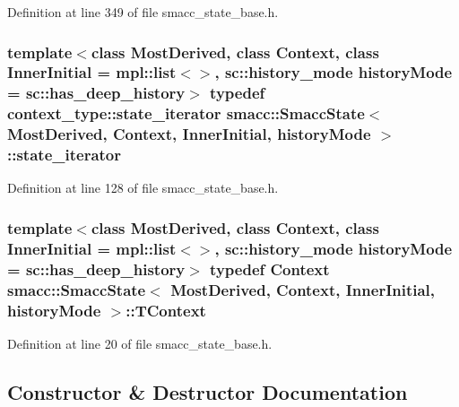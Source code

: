 Definition at line 349 of file smacc\+\_\+state\+\_\+base.\+h.

\subsubsection[{\texorpdfstring{state\+\_\+iterator}{state_iterator}}]{\setlength{\rightskip}{0pt plus 5cm}template$<$class Most\+Derived, class Context, class Inner\+Initial = mpl\+::list$<$$>$, sc\+::history\+\_\+mode history\+Mode = sc\+::has\+\_\+deep\+\_\+history$>$ typedef context\+\_\+type\+::state\+\_\+iterator {\bf smacc\+::\+Smacc\+State}$<$ Most\+Derived, Context, Inner\+Initial, history\+Mode $>$\+::{\bf state\+\_\+iterator}}\hypertarget{classsmacc_1_1SmaccState_a12497b38e710f07cacb5d45efc024339}{}\label{classsmacc_1_1SmaccState_a12497b38e710f07cacb5d45efc024339}


Definition at line 128 of file smacc\+\_\+state\+\_\+base.\+h.

\subsubsection[{\texorpdfstring{T\+Context}{TContext}}]{\setlength{\rightskip}{0pt plus 5cm}template$<$class Most\+Derived, class Context, class Inner\+Initial = mpl\+::list$<$$>$, sc\+::history\+\_\+mode history\+Mode = sc\+::has\+\_\+deep\+\_\+history$>$ typedef Context {\bf smacc\+::\+Smacc\+State}$<$ Most\+Derived, Context, Inner\+Initial, history\+Mode $>$\+::{\bf T\+Context}}\hypertarget{classsmacc_1_1SmaccState_a9953ba0428a8c46f7d72c70bc3f87db4}{}\label{classsmacc_1_1SmaccState_a9953ba0428a8c46f7d72c70bc3f87db4}


Definition at line 20 of file smacc\+\_\+state\+\_\+base.\+h.



\subsection{Constructor \& Destructor Documentation}
